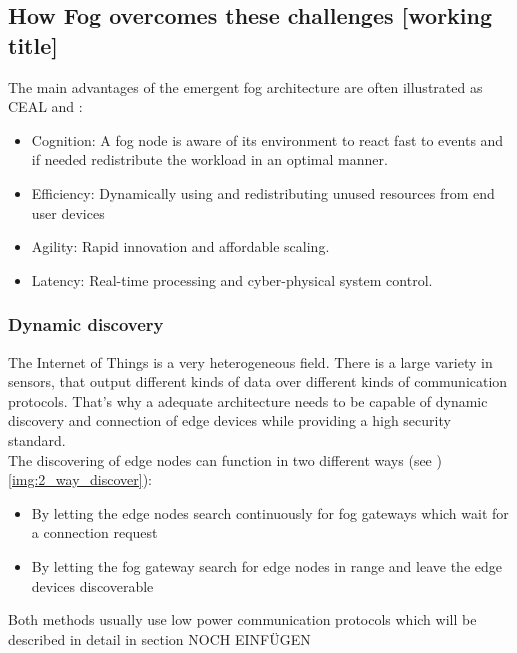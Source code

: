 \subsection{How Fog overcomes these challenges [working title]}

The main advantages of the emergent fog architecture are often illustrated as CEAL \cite[p. 858]{DBLP:journals/iotj/ChiangZ16} and \cite[p. 7]{OpenFog}:

\begin{itemize}
	\item Cognition: A fog node is aware of its environment to react fast to events and if needed redistribute the workload in an optimal manner.
	\item Efficiency: Dynamically using and redistributing unused resources from end user devices
	\item Agility: Rapid innovation and affordable scaling.
	\item Latency: Real-time processing and cyber-physical system control.
\end{itemize}

\subsubsection{Dynamic discovery}
The Internet of Things is a very heterogeneous field. There is a large variety in sensors, that output  different kinds of data over different kinds of communication protocols. That's why a adequate architecture needs to be capable of dynamic discovery and connection of edge devices while providing a high security standard.\\
The discovering of edge nodes can function in two different ways (see )\autoref{img:2_way_discover}):
\begin{itemize}
	\item By letting the edge nodes search continuously for fog gateways which wait for a connection request
	\item By letting the fog gateway search for edge nodes in range and leave the edge devices discoverable
\end{itemize}


Both methods usually use low power communication protocols which will be described in detail in section NOCH EINFÜGEN


